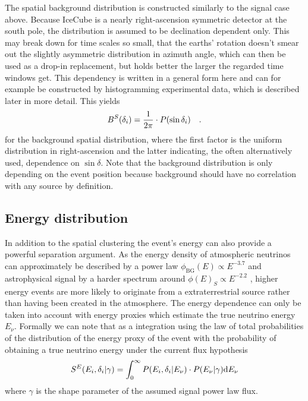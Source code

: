 The spatial background distribution is constructed similarly to the signal case above.
Because IceCube is a nearly right-ascension symmetric detector at the south pole, the distribution is assumed to be declination dependent only.
This may break down for time scales so small, that the earths' rotation doesn't smear out the slightly asymmetric distribution in azimuth angle, which can then be used as a drop-in replacement, but holds better the larger the regarded time windows get.
This dependency is written in a general form here and can for example be constructed by histogramming experimental data, which is described later in more detail.
This yields
\begin{equation}
  B^S(\delta_i) = \frac{1}{2\pi} \cdot P(\sin\delta_i)
  \quad\text{.}
\end{equation}
for the background spatial distribution, where the first factor is the uniform distribution in right-ascension and the latter indicating, the often alternatively used, dependence on $\sin\delta$.
Note that the background distribution is only depending on the event position because background should have no correlation with any source by definition.

\subsection{Energy distribution}
In addition to the spatial clustering the event's energy can also provide a powerful separation argument.
As the energy density of atmospheric neutrinos can approximately be described by a power law $\phi_\mathrm{BG}(E) \propto E^{-3.7}$ and astrophysical signal by a harder spectrum around $\phi(E)_S \propto E^{-2.2}$ , higher energy events are more likely to originate from a extraterrestrial source rather than having been created in the atmosphere.
The energy dependence can only be taken into account with energy proxies which estimate the true neutrino energy $E_\nu$.
Formally we can note that as a integration using the law of total probabilities of the distribution of the energy proxy of the event with the probability of obtaining a true neutrino energy under the current flux hypothesis
\begin{equation}
  S^E(E_i, \delta_i|\gamma) =
    \int_0^\infty P(E_i,\delta_i|E_\nu)\cdot P(E_\nu|\gamma) \mathrm{d}E_\nu
\end{equation}
where $\gamma$ is the shape parameter of the assumed signal power law flux.

